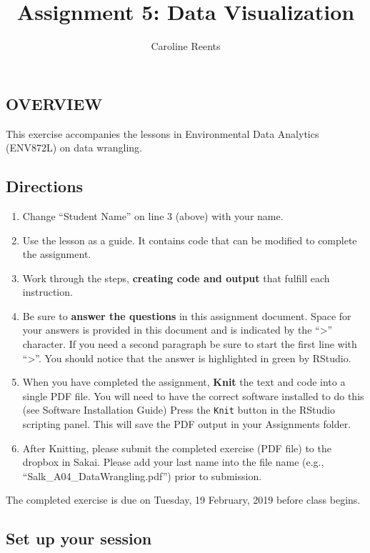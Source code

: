 \documentclass[]{article}
\title{Assignment 5: Data Visualization}
\author{Caroline Reents}
\date{}
\providecommand{\tightlist}{%
  \setlength{\itemsep}{0pt}\setlength{\parskip}{0pt}}
\begin{document}
\maketitle

\subsection{OVERVIEW}\label{overview}

This exercise accompanies the lessons in Environmental Data Analytics
(ENV872L) on data wrangling.

\subsection{Directions}\label{directions}

\begin{enumerate}
\def\labelenumi{\arabic{enumi}.}
\tightlist
\item
  Change ``Student Name'' on line 3 (above) with your name.
\item
  Use the lesson as a guide. It contains code that can be modified to
  complete the assignment.
\item
  Work through the steps, \textbf{creating code and output} that fulfill
  each instruction.
\item
  Be sure to \textbf{answer the questions} in this assignment document.
  Space for your answers is provided in this document and is indicated
  by the ``\textgreater{}'' character. If you need a second paragraph be
  sure to start the first line with ``\textgreater{}''. You should
  notice that the answer is highlighted in green by RStudio.
\item
  When you have completed the assignment, \textbf{Knit} the text and
  code into a single PDF file. You will need to have the correct
  software installed to do this (see Software Installation Guide) Press
  the \texttt{Knit} button in the RStudio scripting panel. This will
  save the PDF output in your Assignments folder.
\item
  After Knitting, please submit the completed exercise (PDF file) to the
  dropbox in Sakai. Please add your last name into the file name (e.g.,
  ``Salk\_A04\_DataWrangling.pdf'') prior to submission.
\end{enumerate}

The completed exercise is due on Tuesday, 19 February, 2019 before class
begins.

\subsection{Set up your session}\label{set-up-your-session}
\end{document}
